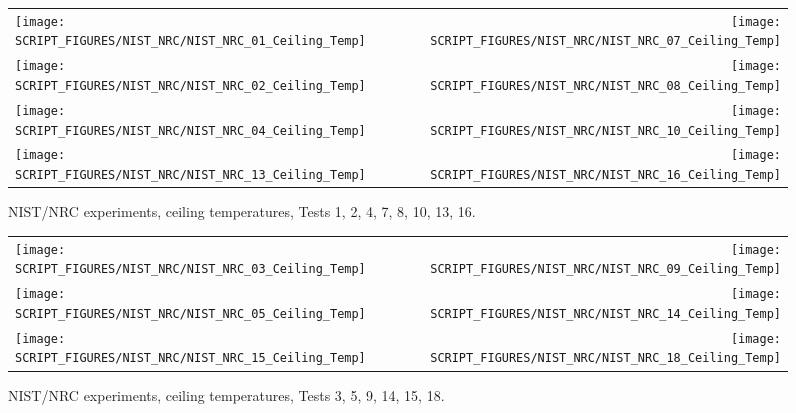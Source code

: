 \begin{figure}[p]
\begin{tabular*}{\textwidth}{l@{\extracolsep{\fill}}r}
\texttt{[image: SCRIPT\_FIGURES/NIST\_NRC/NIST\_NRC\_01\_Ceiling\_Temp]} &
\texttt{[image: SCRIPT\_FIGURES/NIST\_NRC/NIST\_NRC\_07\_Ceiling\_Temp]} \\
\texttt{[image: SCRIPT\_FIGURES/NIST\_NRC/NIST\_NRC\_02\_Ceiling\_Temp]} &
\texttt{[image: SCRIPT\_FIGURES/NIST\_NRC/NIST\_NRC\_08\_Ceiling\_Temp]} \\
\texttt{[image: SCRIPT\_FIGURES/NIST\_NRC/NIST\_NRC\_04\_Ceiling\_Temp]} &
\texttt{[image: SCRIPT\_FIGURES/NIST\_NRC/NIST\_NRC\_10\_Ceiling\_Temp]} \\
\texttt{[image: SCRIPT\_FIGURES/NIST\_NRC/NIST\_NRC\_13\_Ceiling\_Temp]} &
\texttt{[image: SCRIPT\_FIGURES/NIST\_NRC/NIST\_NRC\_16\_Ceiling\_Temp]}
\end{tabular*}
\caption{NIST/NRC experiments, ceiling temperatures, Tests 1, 2, 4, 7, 8, 10, 13, 16.}
\label{NIST_NRC_Ceiling_Temp_Closed}
\end{figure}

\begin{figure}[p]
\begin{tabular*}{\textwidth}{l@{\extracolsep{\fill}}r}
\texttt{[image: SCRIPT\_FIGURES/NIST\_NRC/NIST\_NRC\_03\_Ceiling\_Temp]} &
\texttt{[image: SCRIPT\_FIGURES/NIST\_NRC/NIST\_NRC\_09\_Ceiling\_Temp]} \\
\texttt{[image: SCRIPT\_FIGURES/NIST\_NRC/NIST\_NRC\_05\_Ceiling\_Temp]} &
\texttt{[image: SCRIPT\_FIGURES/NIST\_NRC/NIST\_NRC\_14\_Ceiling\_Temp]} \\
\texttt{[image: SCRIPT\_FIGURES/NIST\_NRC/NIST\_NRC\_15\_Ceiling\_Temp]} &
\texttt{[image: SCRIPT\_FIGURES/NIST\_NRC/NIST\_NRC\_18\_Ceiling\_Temp]}
\end{tabular*}
\caption{NIST/NRC experiments, ceiling temperatures, Tests 3, 5, 9, 14, 15, 18.}
\label{NIST_NRC_Ceiling_Temp_Open}
\end{figure}

